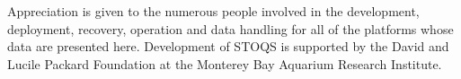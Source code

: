 \documentclass[conference]{IEEEtran}
\begin{document}
Appreciation is given to the numerous people involved in the development, deployment, recovery, operation and data handling for all of the platforms whose data are presented here. Development of STOQS is supported by the David and Lucile Packard Foundation at the Monterey Bay Aquarium Research Institute.








%




\end{document}
